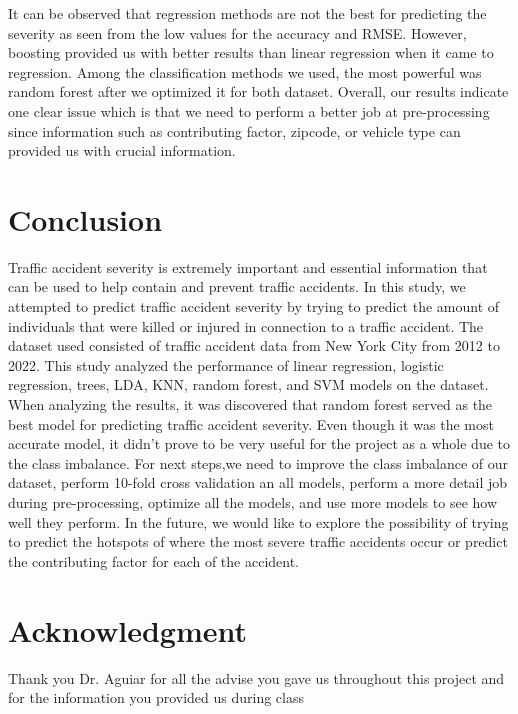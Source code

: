 \documentclass[conference]{IEEEtran}
\begin{document}
	\begin{table}[H]
		\centering
		\caption{Results for the regression models}
	\end{table}
	It can be observed that regression methods are not the best for predicting the severity as seen from the low values for the accuracy and RMSE. However, boosting provided us with better results than linear regression when it came to regression. Among the classification methods we used, the most powerful was random forest after we optimized it for both dataset. Overall, our results indicate one clear issue which is that we need to perform a better job at pre-processing since information such as contributing factor, zipcode, or vehicle type can provided us with crucial information. 
\section{Conclusion}
Traffic accident severity is extremely important and essential information that can be used to help contain and prevent traffic accidents. In this study, we attempted to predict traffic accident severity by trying to predict the amount of individuals that were killed or injured in connection to a traffic accident. The dataset used consisted of traffic accident data from New York City from 2012 to 2022. This study analyzed the performance of linear regression, logistic regression, trees, LDA, KNN, random forest, and SVM models on the dataset. When analyzing the results, it was discovered that random forest served as the best model for predicting traffic accident severity. Even though it was the most accurate model, it didn’t prove to be very useful for the project as a whole due to the class imbalance. For next steps,we need to improve the class imbalance of our dataset, perform 10-fold cross validation an all models, perform a more detail job during pre-processing, optimize all the models, and use more models to see how well they perform. In the future, we would like to explore the possibility of trying to predict the hotspots of where the most severe traffic accidents occur or predict the contributing factor for each of the accident.
\section*{Acknowledgment}
Thank you Dr. Aguiar for all the advise you gave us throughout this project and for the information you provided us during class


\vspace{12pt}
\end{document}
